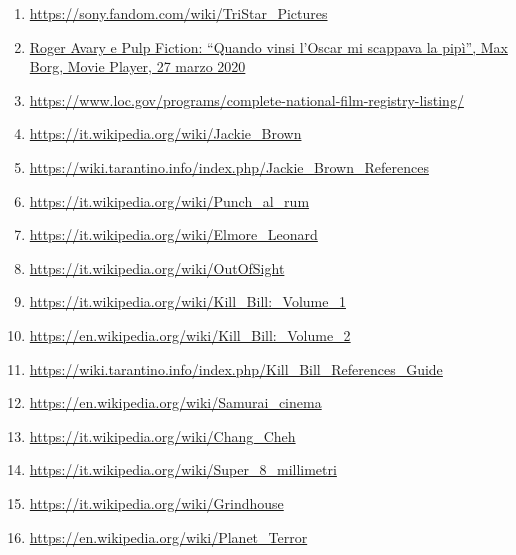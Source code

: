 \documentclass[12pt]{article} %
\begin{document}
\begin{flushleft}
\begin{enumerate}
        \item \href{https://sony.fandom.com/wiki/TriStar_Pictures}{https://sony.fandom.com/wiki/TriStar\_Pictures}
        \item \href{https://movieplayer.it/articoli/roger-avary-pulp-fiction-intervista_22689/}{Roger Avary e Pulp Fiction: “Quando vinsi l’Oscar mi scappava la pipì”, Max Borg, Movie Player, 27 marzo 2020}
        \item \href{https://www.loc.gov/programs/national-film-preservation-board/film-registry/complete-national-film-registry-listing/}{https://www.loc.gov/programs/complete-national-film-registry-listing/}
        \item \href{https://it.wikipedia.org/wiki/Jackie_Brown}{https://it.wikipedia.org/wiki/Jackie\_Brown}
        \item \href{https://wiki.tarantino.info/index.php/Jackie_Brown_movie_and_TV_references_guide}{https://wiki.tarantino.info/index.php/Jackie\_Brown\_References}
        \item \href{https://it.wikipedia.org/wiki/Punch_al_rum}{https://it.wikipedia.org/wiki/Punch\_al\_rum}
        \item \href{https://it.wikipedia.org/wiki/Elmore_Leonard}{https://it.wikipedia.org/wiki/Elmore\_Leonard}
        \item \href{https://it.wikipedia.org/wiki/Out_of_Sight_(film)}{https://it.wikipedia.org/wiki/OutOfSight}
        \item \href{https://it.wikipedia.org/wiki/Kill_Bill:_Volume_1}{https://it.wikipedia.org/wiki/Kill\_Bill:\_Volume\_1}
        \item \href{https://en.wikipedia.org/wiki/Kill_Bill:_Volume_2}{https://en.wikipedia.org/wiki/Kill\_Bill:\_Volume\_2}
        \item \href{https://wiki.tarantino.info/index.php/Kill_Bill_References_Guide}{https://wiki.tarantino.info/index.php/Kill\_Bill\_References\_Guide}
        \item \href{https://en.wikipedia.org/wiki/Samurai_cinema}{https://en.wikipedia.org/wiki/Samurai\_cinema}
        \item \href{https://it.wikipedia.org/wiki/Chang_Cheh}{https://it.wikipedia.org/wiki/Chang\_Cheh}
        \item \href{https://it.wikipedia.org/wiki/Super_8_millimetri}{https://it.wikipedia.org/wiki/Super\_8\_millimetri}
        \item \href{https://it.wikipedia.org/wiki/Grindhouse}{https://it.wikipedia.org/wiki/Grindhouse}
        \item \href{https://en.wikipedia.org/wiki/Planet_Terror}{https://en.wikipedia.org/wiki/Planet\_Terror}

\end{enumerate}
\end{flushleft}
\end{document}
